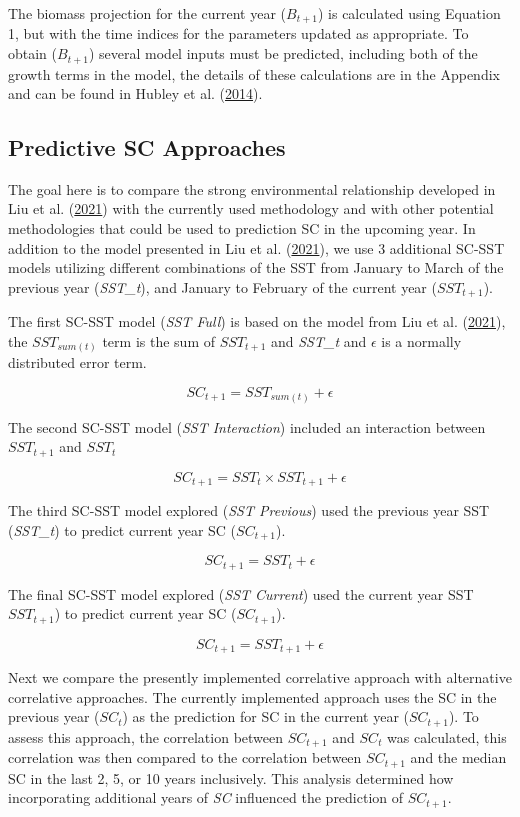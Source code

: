 \documentclass[
]{article}
\begin{document}
The biomass projection for the current year (\(B_{t+1}\)) is calculated using Equation 1, but with the time indices for the parameters updated as appropriate. To obtain (\(B_{t+1}\)) several model inputs must be predicted, including both of the growth terms in the model, the details of these calculations are in the Appendix and can be found in Hubley et al. (\protect\hyperlink{ref-hubleyGeorgesBankBrowns2014}{2014}).

\hypertarget{predictive-sc-approaches}{%
\subsection{Predictive SC Approaches}\label{predictive-sc-approaches}}

The goal here is to compare the strong environmental relationship developed in Liu et al. (\protect\hyperlink{ref-liuUsingSatelliteRemote2021}{2021}) with the currently used methodology and with other potential methodologies that could be used to prediction SC in the upcoming year. In addition to the model presented in Liu et al. (\protect\hyperlink{ref-liuUsingSatelliteRemote2021}{2021}), we use 3 additional SC-SST models utilizing different combinations of the SST from January to March of the previous year (\emph{SST\_t}), and January to February of the current year (\(SST_{t+1}\)).

The first SC-SST model (\emph{SST Full}) is based on the model from Liu et al. (\protect\hyperlink{ref-liuUsingSatelliteRemote2021}{2021}), the \(SST_{sum(t)}\) term is the sum of \(SST_{t+1}\) and \emph{SST\_t} and \(\epsilon\) is a normally distributed error term.

\[ SC_{t+1} = SST_{sum(t)}  + \epsilon \]

The second SC-SST model (\emph{SST Interaction}) included an interaction between \(SST_{t+1}\) and \(SST_{t}\)

\[ SC_{t+1} = SST_{t} \times SST_{t+1} + \epsilon \]

The third SC-SST model explored (\emph{SST Previous}) used the previous year SST (\emph{SST\_t}) to predict current year SC (\(SC_{t+1}\)).

\[   SC_{t+1} = SST_{t} + \epsilon  \]

The final SC-SST model explored (\emph{SST Current}) used the current year SST \(SST_{t+1}\)) to predict current year SC (\(SC_{t+1}\)).

\[   SC_{t+1} = SST_{t+1} + \epsilon  \]

Next we compare the presently implemented correlative approach with alternative correlative approaches. The currently implemented approach uses the SC in the previous year (\(SC_t\)) as the prediction for SC in the current year (\(SC_{t+1}\)). To assess this approach, the correlation between \(SC_{t+1}\) and \(SC_t\) was calculated, this correlation was then compared to the correlation between \(SC_{t+1}\) and the median SC in the last 2, 5, or 10 years inclusively. This analysis determined how incorporating additional years of \emph{SC} influenced the prediction of \(SC_{t+1}\).
\end{document}
